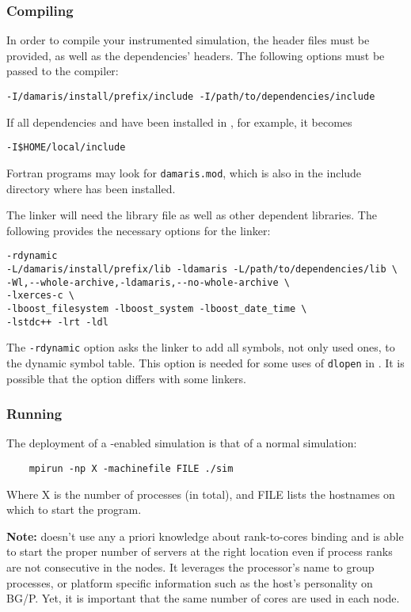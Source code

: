 \subsubsection{Compiling}

In order to compile your instrumented simulation, the \Damaris{} header files must be
provided, as well as the dependencies' headers. The following options must be passed to the compiler:

\begin{verbatim}
-I/damaris/install/prefix/include -I/path/to/dependencies/include
\end{verbatim}
If all dependencies and \Damaris{} have been installed in \installdir, for example, it becomes
\begin{verbatim}
-I$HOME/local/include
\end{verbatim}

Fortran programs may look for \texttt{damaris.mod}, which is also in the include directory
where \Damaris{} has been installed.

The linker will need the \Damaris{} library file  as well as other dependent libraries.
The following provides the necessary options for the linker:
\begin{verbatim}
-rdynamic
-L/damaris/install/prefix/lib -ldamaris -L/path/to/dependencies/lib \
-Wl,--whole-archive,-ldamaris,--no-whole-archive \
-lxerces-c \
-lboost_filesystem -lboost_system -lboost_date_time \
-lstdc++ -lrt -ldl
\end{verbatim}

The \texttt{-rdynamic} option asks the linker to add all symbols, not only used ones, 
to the dynamic symbol table. 
This option is needed for some uses of \texttt{dlopen} in \Damaris. It is possible that 
the option differs with some linkers.

\subsubsection{Running}

The deployment of a \Damaris-enabled simulation is that of a normal simulation:

\begin{verbatim}
	mpirun -np X -machinefile FILE ./sim
\end{verbatim}

Where X is the number of processes (in total), and FILE lists the hostnames on which to start the program.

\textbf{Note:} \Damaris{} doesn't use any a priori knowledge about rank-to-cores binding and is able
to start the proper number of servers at the right location even if process ranks are not consecutive 
in the nodes. It leverages the processor's name to group processes, or platform specific information 
such as the host's personality on BG/P. Yet, it is important that the same number of cores are used
in each node.

